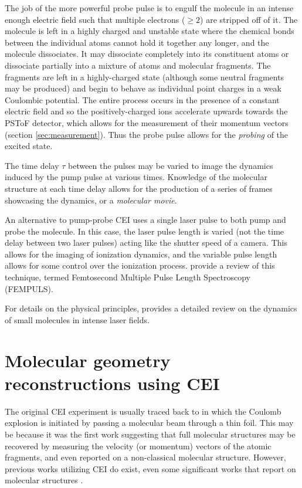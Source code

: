 The job of the more powerful probe pulse is to engulf the molecule in an intense enough electric field such that multiple electrons ($\ge2$) are stripped off of it. The molecule is left in a highly charged and unstable state where the chemical bonds between the individual atoms cannot hold it together any longer, and the molecule dissociates. It may dissociate completely into its constituent atoms or dissociate partially into a mixture of atoms and molecular fragments. The fragments are left in a highly-charged state (although some neutral fragments may be produced) and begin to behave as individual point charges in a weak Coulombic potential. The entire process occurs in the presence of a constant electric field and so the positively-charged ions accelerate upwards towards the PSToF detector, which allows for the measurement of their momentum vectors (section \ref{sec:measurement}). Thus the probe pulse allows for the \emph{probing} of the excited state.

The time delay $\tau$ between the pulses may be varied to image the dynamics induced by the pump pulse at various times. Knowledge of the molecular structure at each time delay allows for the production of a series of frames showcasing the dynamics, or a \emph{molecular movie}.

An alternative to pump-probe CEI uses a single laser pulse to both pump and probe the molecule. In this case, the laser pulse length is varied (not the time delay between two laser pulses) acting like the shutter speed of a camera. This allows for the imaging of ionization dynamics, and the variable pulse length allows for some control over the ionization process.  \citet{Karimi13} provide a review of this technique, termed Femtosecond Multiple Pulse Length Spectroscopy (FEMPULS).

For details on the physical principles, \citet{Posthumus04} provides a detailed review on the dynamics of small molecules in intense laser fields.

\section{Molecular geometry reconstructions using CEI}
The original CEI experiment is usually traced back to \citet{Vager89} in which the Coulomb explosion is initiated by passing a molecular beam through a thin foil. This may be because it was the first work suggesting that full molecular structures may be recovered by measuring the velocity (or momentum) vectors of the atomic fragments, and even reported on a non-classical molecular structure. However, previous works utilizing CEI do exist, even some significant works that report on molecular structures \citep{Kanter79}.

